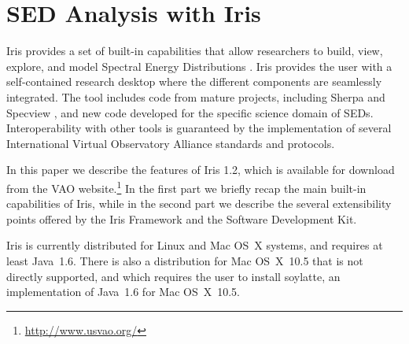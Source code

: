 \section{SED Analysis with Iris}
Iris provides a set of built-in capabilities that allow researchers to build, view, explore, and model Spectral Energy Distributions \citep[SEDs;][]{2012ASPC..461..893D}. Iris provides the user with a self-contained research desktop where the different components are seamlessly integrated. The tool includes code from mature projects, including Sherpa \citep{2007ASPC..376..543D} and Specview \citep{2000ASPC..216...79B}, and new code developed for the specific science domain of SEDs. Interoperability with other tools is guaranteed by the implementation of several International Virtual Observatory Alliance standards and protocols.

In this paper we describe the features of Iris 1.2, which is available for download from the VAO website.\footnote{\url{http://www.usvao.org/}} In the first part we briefly recap the main built-in capabilities of Iris, while in the second part we describe the several extensibility points offered by the Iris Framework and the Software Development Kit.

Iris is currently distributed for Linux and Mac OS~X systems, and requires at least Java~1.6. There is also a distribution for Mac OS~X~10.5 that is not directly supported, and which requires the user to install soylatte, an implementation of Java~1.6 for Mac OS~X~10.5.

